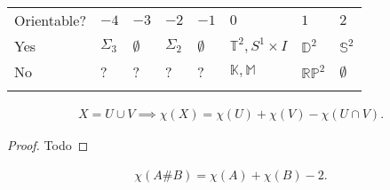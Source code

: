 \begin{fact}

\begin{longtable}[]{@{}
  >{\raggedright\arraybackslash}p{}
  >{\raggedright\arraybackslash}p{}
  >{\raggedright\arraybackslash}p{}
  >{\raggedright\arraybackslash}p{}
  >{\raggedright\arraybackslash}p{}
  >{\raggedright\arraybackslash}p{}
  >{\raggedright\arraybackslash}p{}
  >{\raggedright\arraybackslash}p{}@{}}
\toprule
Orientable? & \(-4\) & \(-3\) & \(-2\) & \(-1\) & \(0\) & \(1\) &
\(2\) \\ \addlinespace
\midrule
\endhead
Yes & \(\Sigma_3\) & \(\emptyset\) & \(\Sigma_2\) & \(\emptyset\) &
\({\mathbb{T}}^2, S^1\times I\) & \({\mathbb{D}}^2\) &
\({\mathbb{S}}^2\) \\ \addlinespace
No & ? & ? & ? & ? & \({\mathbb{K}}, {\mathbb{M}}\) &
\({\mathbb{RP}}^2\) & \(\emptyset\) \\ \addlinespace
\bottomrule
\end{longtable}

\end{fact}

\begin{proposition}

\begin{align*}  
X = U\cup V \implies \chi(X) = \chi(U) + \chi(V) - \chi (U\cap V)
.\end{align*}

\end{proposition}

\begin{proof}

Todo

\end{proof}


\begin{corollary}

\begin{align*}  
\chi(A \# B) = \chi(A) + \chi(B) - 2
.\end{align*}

\end{corollary}

